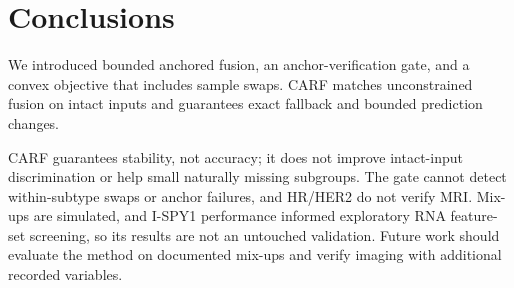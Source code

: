 \documentclass[a4paper,runningheads]{llncs}
\begin{document}
\section{Conclusions}

We introduced bounded anchored fusion, an anchor-verification gate, and a convex objective that includes sample swaps. CARF matches unconstrained fusion on intact inputs and guarantees exact fallback and bounded prediction changes.

CARF guarantees stability, not accuracy; it does not improve intact-input discrimination or help small naturally missing subgroups. The gate cannot detect within-subtype swaps or anchor failures, and HR/HER2 do not verify MRI. Mix-ups are simulated, and I-SPY1 performance informed exploratory RNA feature-set screening, so its results are not an untouched validation. Future work should evaluate the method on documented mix-ups and verify imaging with additional recorded variables.



\end{document}
